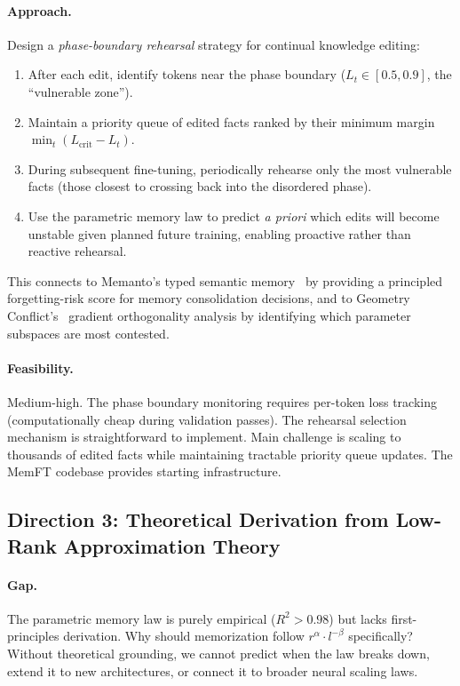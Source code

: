 \documentclass[11pt,a4paper]{article}
\begin{document}
\paragraph{Approach.} Design a \emph{phase-boundary rehearsal} strategy for continual knowledge editing:
\begin{enumerate}
\item After each edit, identify tokens near the phase boundary ($L_t \in [0.5, 0.9]$, the ``vulnerable zone'').
\item Maintain a priority queue of edited facts ranked by their minimum margin $\min_t(L_{\mathrm{crit}} - L_t)$.
\item During subsequent fine-tuning, periodically rehearse only the most vulnerable facts (those closest to crossing back into the disordered phase).
\item Use the parametric memory law to predict \emph{a priori} which edits will become unstable given planned future training, enabling proactive rather than reactive rehearsal.
\end{enumerate}
This connects to Memanto's typed semantic memory~\cite{memanto2026} by providing a principled forgetting-risk score for memory consolidation decisions, and to Geometry Conflict's~\cite{geometry2026} gradient orthogonality analysis by identifying which parameter subspaces are most contested.

\paragraph{Feasibility.} Medium-high. The phase boundary monitoring requires per-token loss tracking (computationally cheap during validation passes). The rehearsal selection mechanism is straightforward to implement. Main challenge is scaling to thousands of edited facts while maintaining tractable priority queue updates. The MemFT codebase provides starting infrastructure.

\subsection{Direction 3: Theoretical Derivation from Low-Rank Approximation Theory}

\paragraph{Gap.} The parametric memory law is purely empirical ($R^2 > 0.98$) but lacks first-principles derivation. Why should memorization follow $r^{\alpha} \cdot l^{-\beta}$ specifically? Without theoretical grounding, we cannot predict when the law breaks down, extend it to new architectures, or connect it to broader neural scaling laws.
\end{document}
